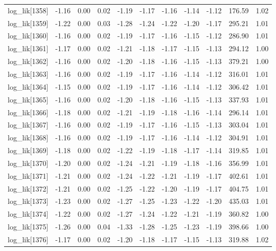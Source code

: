\begin{table}[ht]
\begin{tabular}{rrrrrrrrrrr}
  log\_lik[1358] & -1.16 & 0.00 & 0.02 & -1.19 & -1.17 & -1.16 & -1.14 & -1.12 & 176.59 & 1.02 \\ 
  log\_lik[1359] & -1.22 & 0.00 & 0.03 & -1.28 & -1.24 & -1.22 & -1.20 & -1.17 & 295.21 & 1.01 \\ 
  log\_lik[1360] & -1.16 & 0.00 & 0.02 & -1.19 & -1.17 & -1.16 & -1.15 & -1.12 & 286.90 & 1.01 \\ 
  log\_lik[1361] & -1.17 & 0.00 & 0.02 & -1.21 & -1.18 & -1.17 & -1.15 & -1.13 & 294.12 & 1.00 \\ 
  log\_lik[1362] & -1.16 & 0.00 & 0.02 & -1.20 & -1.18 & -1.16 & -1.15 & -1.13 & 379.21 & 1.00 \\ 
  log\_lik[1363] & -1.16 & 0.00 & 0.02 & -1.19 & -1.17 & -1.16 & -1.14 & -1.12 & 316.01 & 1.01 \\ 
  log\_lik[1364] & -1.15 & 0.00 & 0.02 & -1.19 & -1.17 & -1.16 & -1.14 & -1.12 & 306.42 & 1.01 \\ 
  log\_lik[1365] & -1.16 & 0.00 & 0.02 & -1.20 & -1.18 & -1.16 & -1.15 & -1.13 & 337.93 & 1.01 \\ 
  log\_lik[1366] & -1.18 & 0.00 & 0.02 & -1.21 & -1.19 & -1.18 & -1.16 & -1.14 & 296.14 & 1.01 \\ 
  log\_lik[1367] & -1.16 & 0.00 & 0.02 & -1.19 & -1.17 & -1.16 & -1.15 & -1.13 & 303.04 & 1.01 \\ 
  log\_lik[1368] & -1.16 & 0.00 & 0.02 & -1.19 & -1.17 & -1.16 & -1.14 & -1.12 & 304.91 & 1.01 \\ 
  log\_lik[1369] & -1.18 & 0.00 & 0.02 & -1.22 & -1.19 & -1.18 & -1.17 & -1.14 & 319.85 & 1.01 \\ 
  log\_lik[1370] & -1.20 & 0.00 & 0.02 & -1.24 & -1.21 & -1.19 & -1.18 & -1.16 & 356.99 & 1.01 \\ 
  log\_lik[1371] & -1.21 & 0.00 & 0.02 & -1.24 & -1.22 & -1.21 & -1.19 & -1.17 & 402.61 & 1.01 \\ 
  log\_lik[1372] & -1.21 & 0.00 & 0.02 & -1.25 & -1.22 & -1.20 & -1.19 & -1.17 & 404.75 & 1.01 \\ 
  log\_lik[1373] & -1.23 & 0.00 & 0.02 & -1.27 & -1.25 & -1.23 & -1.22 & -1.20 & 435.03 & 1.01 \\ 
  log\_lik[1374] & -1.22 & 0.00 & 0.02 & -1.27 & -1.24 & -1.22 & -1.21 & -1.19 & 360.82 & 1.00 \\ 
  log\_lik[1375] & -1.26 & 0.00 & 0.04 & -1.33 & -1.28 & -1.25 & -1.23 & -1.19 & 398.66 & 1.00 \\ 
  log\_lik[1376] & -1.17 & 0.00 & 0.02 & -1.20 & -1.18 & -1.17 & -1.15 & -1.13 & 319.88 & 1.02 \\ 

\end{tabular}
\end{table}
